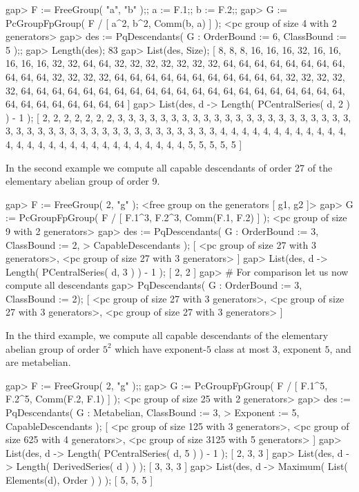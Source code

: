 \beginexample
gap> F := FreeGroup( "a", "b" );; a := F.1;; b := F.2;;         
gap> G := PcGroupFpGroup( F / [ a^2, b^2, Comm(b, a) ] );
<pc group of size 4 with 2 generators>
gap> des := PqDescendants( G : OrderBound := 6, ClassBound := 5 );;
gap> Length(des);
83
gap> List(des, Size); 
[ 8, 8, 8, 16, 16, 16, 32, 16, 16, 16, 16, 16, 32, 32, 64, 64, 32, 32, 32, 
  32, 32, 32, 32, 64, 64, 64, 64, 64, 64, 64, 64, 64, 64, 64, 32, 32, 32, 32, 
  64, 64, 64, 64, 64, 64, 64, 64, 64, 64, 64, 32, 32, 32, 32, 32, 64, 64, 64, 
  64, 64, 64, 64, 64, 64, 64, 64, 64, 64, 64, 64, 64, 64, 64, 64, 64, 64, 64, 
  64, 64, 64, 64, 64, 64, 64 ]
gap> List(des, d -> Length( PCentralSeries( d, 2 ) ) - 1 );
[ 2, 2, 2, 2, 2, 2, 2, 3, 3, 3, 3, 3, 3, 3, 3, 3, 3, 3, 3, 3, 3, 3, 3, 3, 3, 
  3, 3, 3, 3, 3, 3, 3, 3, 3, 3, 3, 3, 3, 3, 3, 3, 3, 3, 3, 3, 3, 3, 3, 3, 4, 
  4, 4, 4, 4, 4, 4, 4, 4, 4, 4, 4, 4, 4, 4, 4, 4, 4, 4, 4, 4, 4, 4, 4, 4, 4, 
  4, 4, 4, 5, 5, 5, 5, 5 ]
\endexample

In the second example we compute all  capable descendants of order  27 of
the  elementary abelian group of order 9.  

\beginexample
gap> F := FreeGroup( 2, "g" );
<free group on the generators [ g1, g2 ]>
gap> G := PcGroupFpGroup( F / [ F.1^3, F.2^3, Comm(F.1, F.2) ] );
<pc group of size 9 with 2 generators>
gap> des := PqDescendants( G : OrderBound := 3, ClassBound := 2,
>                              CapableDescendants );
[ <pc group of size 27 with 3 generators>, 
  <pc group of size 27 with 3 generators> ]
gap> List(des, d -> Length( PCentralSeries( d, 3 ) ) - 1 );
[ 2, 2 ]
gap> # For comparison let us now compute all descendants
gap> PqDescendants( G : OrderBound := 3, ClassBound := 2);
[ <pc group of size 27 with 3 generators>, 
  <pc group of size 27 with 3 generators>, 
  <pc group of size 27 with 3 generators> ]
\endexample

In  the  third  example,  we  compute  all  capable  descendants  of  the
elementary abelian group of order  $5^2$ which have exponent-$5$ class at
most $3$, exponent $5$, and are metabelian.

\beginexample
gap> F := FreeGroup( 2, "g" );;                                  
gap> G := PcGroupFpGroup( F / [ F.1^5, F.2^5, Comm(F.2, F.1) ] );
<pc group of size 25 with 2 generators>
gap> des := PqDescendants( G : Metabelian, ClassBound := 3,
>                              Exponent := 5, CapableDescendants );
[ <pc group of size 125 with 3 generators>, 
  <pc group of size 625 with 4 generators>, 
  <pc group of size 3125 with 5 generators> ]
gap> List(des, d -> Length( PCentralSeries( d, 5 ) ) - 1 );
[ 2, 3, 3 ]
gap> List(des, d -> Length( DerivedSeries( d ) ) );
[ 3, 3, 3 ]
gap> List(des, d -> Maximum( List( Elements(d), Order ) ) );     
[ 5, 5, 5 ]
\endexample

